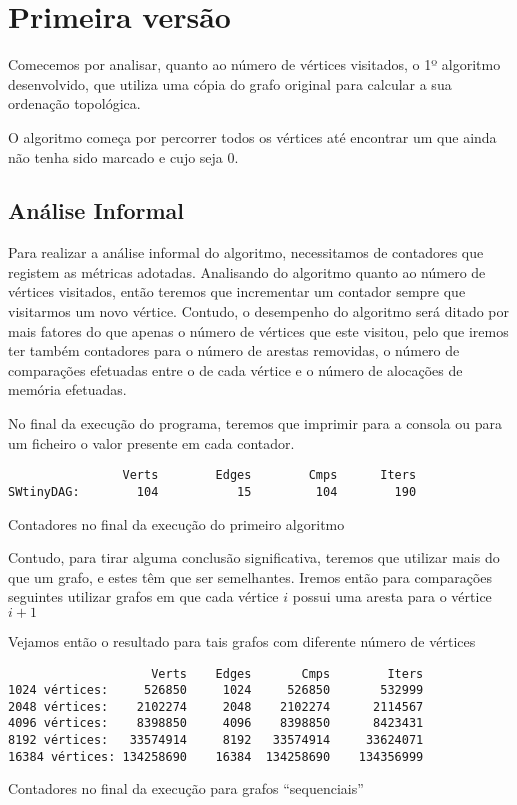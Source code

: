 \chapter{Primeira versão}
Comecemos por analisar, quanto ao número de vértices visitados, o 1º algoritmo
desenvolvido, que utiliza uma cópia do grafo original para calcular a sua
ordenação topológica.

O algoritmo começa por percorrer todos os vértices até encontrar um que ainda
não tenha sido marcado e cujo  seja 0.


\section{Análise Informal}

Para realizar a análise informal do algoritmo, necessitamos de
contadores que registem as métricas adotadas. Analisando do
algoritmo quanto ao número de vértices visitados, então teremos
que incrementar um contador sempre que visitarmos um novo
vértice. Contudo, o desempenho do algoritmo será ditado
por mais fatores do que apenas o número de vértices que este
visitou, pelo que iremos ter também contadores para o número de
arestas removidas, o número de comparações efetuadas entre o
 de cada vértice e o número de alocações de
memória efetuadas.

No final da execução do programa, teremos que imprimir para a
consola ou para um ficheiro o valor presente em cada contador.

\begin{listing}[H]
	\centering
	\begin{verbatim}
                Verts	     Edges	      Cmps      Iters
SWtinyDAG:        104	        15	       104        190
	\end{verbatim}
	\caption{Contadores no final da execução do primeiro algoritmo}
\end{listing}

Contudo, para tirar alguma conclusão significativa, teremos que
utilizar mais do que um grafo, e estes têm que ser semelhantes.
Iremos então para comparações seguintes utilizar grafos em que
cada vértice $i$ possui uma aresta para o vértice $i+1$


Vejamos então o resultado para tais grafos com diferente número
de vértices

\begin{listing}[H]
	\centering
	\begin{verbatim}
                    Verts	 Edges	     Cmps        Iters
1024 vértices:     526850	  1024	   526850       532999
2048 vértices:    2102274	  2048	  2102274      2114567
4096 vértices:    8398850	  4096	  8398850      8423431
8192 vértices:   33574914	  8192	 33574914     33624071
16384 vértices: 134258690	 16384	134258690    134356999
	\end{verbatim}
	\caption{Contadores no final da execução para grafos \enquote{sequenciais}}
	\label{1-2}
\end{listing}

